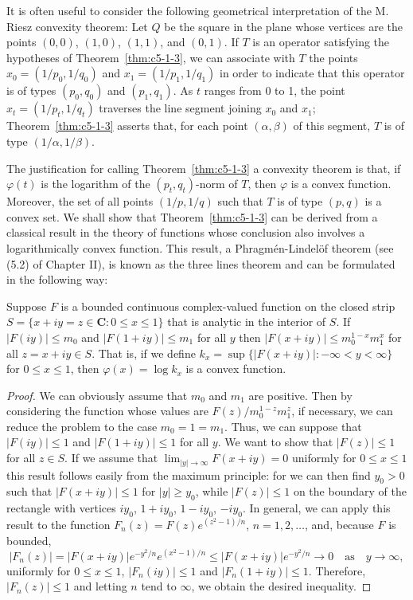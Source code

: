 It is often useful to consider the following geometrical interpretation of the
M. Riesz convexity theorem: Let $Q$ be the square in the plane whose vertices
are the points $(0, 0)$, $(1, 0)$, $(1, 1)$, and $(0, 1)$. If $T$ is an operator
satisfying the hypotheses of Theorem~\ref{thm:c5-1-3}, we can associate with
$T$ the points $x_{0} = (1/p_{0}, 1/q_{0})$ and $x_{1} = (1/p_{1}, 1/q_{1})$ in
order to indicate that this operator is of types $(p_{0}, q_{0})$ and
$(p_{1}, q_{1})$. As $t$ ranges from 0 to 1, the point
$x_{t} = (1/p_{t}, 1/q_{t})$ traverses the line segment joining $x_{0}$ and
$x_{1}$; Theorem~\ref{thm:c5-1-3} asserts that, for each point
$(\alpha, \beta)$ of this segment, $T$ is of type $(1/\alpha, 1/\beta)$.

The justification for calling Theorem~\ref{thm:c5-1-3} a convexity theorem is
that, if $\varphi(t)$ is the logarithm of the $(p_{t}, q_{t})$-norm of $T$,
then $\varphi$ is a convex function. Moreover, the set of all points
$(1/p, 1/q)$ such that $T$ is of type $(p, q)$ is a convex set. We shall show
that Theorem~\ref{thm:c5-1-3} can be derived from a classical result in the
theory of functions whose conclusion also involves a logarithmically convex
function. This result, a Phragm\'en-Lindel\"of theorem (see (5.2)
of Chapter II), is known as the three lines theorem and can be formulated in
the following way:

\begin{lemma}\label{lem:c5-1-4}
Suppose $F$ is a bounded continuous complex-valued function on the closed strip
$S = \{x + iy = z \in \mathbf{C} : 0 \leq x \leq 1\}$ that is analytic in the
interior of $S$. If $|F(iy)| \leq m_{0}$ and $|F(1 + iy)| \leq m_{1}$ for all
$y$ then $|F(x + iy)| \leq m_{0}^{1-x}m_{1}^{x}$ for all $z = x + iy \in S$.
That is, if we define
$k_{x} = \sup\{|F(x + iy)| : -\infty < y < \infty\}$ for $0 \leq x \leq 1$, then
$\varphi(x) = \log k_{x}$ is a convex function.
\end{lemma}

\begin{proof}
We can obviously assume that $m_{0}$ and $m_{1}$ are positive. Then by
considering the function whose values are $F(z)/m_{0}^{1-z}m_{1}^{z}$, if
necessary, we can reduce the problem to the case $m_{0} = 1 = m_{1}$. Thus, we
can suppose that $|F(iy)| \leq 1$ and $|F(1 + iy)| \leq 1$ for all $y$. We want
to show that $|F(z)| \leq 1$ for all $z \in S$. If we assume that
$\lim_{|y| \to \infty}F(x + iy) = 0$ uniformly for $0 \leq x \leq 1$ this
result follows easily from the maximum principle: for we can then find
$y_{0} > 0$ such that $|F(x + iy)| \leq 1$ for $|y| \geq y_{0}$, while
$|F(z)| \leq 1$ on the boundary of the rectangle with vertices $iy_{0}$,
$1 + iy_{0}$, $1 - iy_{0}$, $-iy_{0}$. In general, we can apply this result to
the function $F_{n}(z) = F(z)e^{(z^{2}-1)/n}$, $n = 1, 2, \ldots$, and, because
$F$ is bounded,
\[
|F_{n}(z)|=|F(x+iy)|e^{-y^{2}/n}e^{(x^{2}-1)/n}\leq|F(x+iy)|e^{-y^{2}/n}\to0
\quad\text{as}\quad y\to\infty,
\]
uniformly for $0 \leq x \leq 1$, $|F_{n}(iy)| \leq 1$ and
$|F_{n}(1 + iy)| \leq 1$. Therefore, $|F_{n}(z)| \leq 1$ and letting $n$ tend
to $\infty$, we obtain the desired inequality.
\end{proof}

